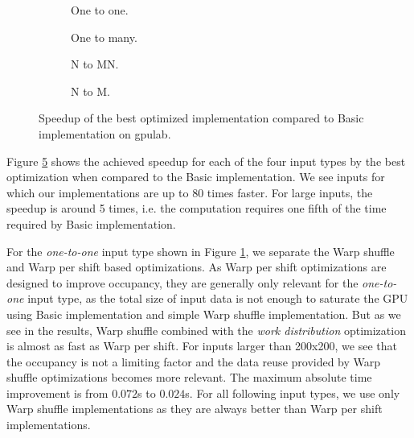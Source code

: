 \begin{figure}[ht]
	\centering	
	\begin{subfigure}{0.4\textwidth}
		\centering
		\def\svgwidth{\textwidth}
		
		\caption{One to one.}
		\label{fig:definition_based_speedup_one_to_one}
	\end{subfigure}
	\begin{subfigure}{0.4\textwidth}
		\centering
		\def\svgwidth{\textwidth}
		
		\caption{One to many.}
		\label{fig:definition_based_speedup_one_to_many}
	\end{subfigure}
	\begin{subfigure}{0.4\textwidth}
		\centering
		\def\svgwidth{\textwidth}
		
		\caption{N to MN.}
		\label{fig:definition_based_speedup_n_to_mn}
	\end{subfigure}
	\begin{subfigure}{0.4\textwidth}
		\centering
		\def\svgwidth{\textwidth}
		
		\caption{N to M.}
		\label{fig:definition_based_speedup_n_to_m}
	\end{subfigure}
	\caption{Speedup of the best optimized implementation compared to Basic implementation on gpulab.}
	\label{fig:definition_based_speedup}
\end{figure}

Figure \ref{fig:definition_based_speedup} shows the achieved speedup for each of the four input types by the best optimization when compared to the Basic implementation. We see inputs for which our implementations are up to 80 times faster. For large inputs, the speedup is around 5 times, i.e. the computation requires one fifth of the time required by Basic implementation.

For the \textit{one-to-one} input type shown in Figure \ref{fig:definition_based_speedup_one_to_one}, we separate the Warp shuffle and Warp per shift based optimizations. As Warp per shift optimizations are designed to improve occupancy, they are generally only relevant for the \textit{one-to-one} input type, as the total size of input data is not enough  to saturate the GPU using Basic implementation and simple Warp shuffle implementation. But as we see in the results, Warp shuffle combined with the \textit{work distribution} optimization is almost as fast as Warp per shift. For inputs larger than 200x200, we see that the occupancy is not a limiting factor and the data reuse provided by Warp shuffle optimizations becomes more relevant. The maximum absolute time improvement is from $0.072$s to $0.024$s. For all following input types, we use only Warp shuffle implementations as they are always better than Warp per shift implementations.

